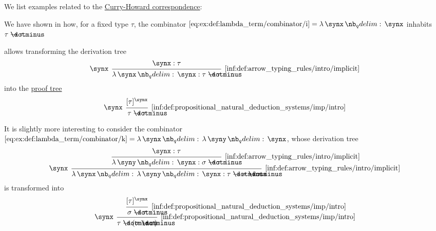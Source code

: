 \begin{example}\label{ex:con:curry_howard_correspondence}
  We list examples related to the \hyperref[con:curry_howard_correspondence]{Curry-Howard correspondence}:
  \begin{thmenum}
     We have shown in  how, for a fixed type \( \tau \), the combinator \( \ref{eq:ex:def:lambda_term/combinator/i} = \qabs \synx \synx \) inhabits \( \tau \synimplies \tau \).

     allows transforming the derivation tree
    \begin{equation*}
      \begin{prooftree}
        \hypo{ \synx: \tau }
        \infer[left label=\( \synx \)]1[\ref{inf:def:arrow_typing_rules/intro/implicit}]{ \qabs \synx \synx: \tau \synimplies \tau }
      \end{prooftree}
    \end{equation*}
    into the \hyperref[def:natural_deduction_proof_tree]{proof tree}
    \begin{equation*}
      \begin{prooftree}
        \hypo{ [\tau]^\synx }
        \infer[left label=\( \synx \)]1[\ref{inf:def:propositional_natural_deduction_systems/imp/intro}]{ \tau \synimplies \tau }
      \end{prooftree}
    \end{equation*}

    It is slightly more interesting to consider the combinator \( \ref{eq:ex:def:lambda_term/combinator/k} = \qabs \synx \qabs \syny \synx \), whose derivation tree
    \begin{equation*}
      \begin{prooftree}
        \hypo{ \synx: \tau }
        \infer1[\ref{inf:def:arrow_typing_rules/intro/implicit}]{ \qabs \syny \synx: \sigma \synimplies \tau }
        \infer[left label=\( \synx \)]1[\ref{inf:def:arrow_typing_rules/intro/implicit}]{ \qabs \synx \qabs \syny \synx: \tau \synimplies \sigma \synimplies \tau }
      \end{prooftree}
    \end{equation*}
    is transformed into
    \begin{equation*}
      \begin{prooftree}
        \hypo{ [\tau]^\synx }
        \infer1[\ref{inf:def:propositional_natural_deduction_systems/imp/intro}]{ \sigma \synimplies \tau }
        \infer[left label=\( \synx \)]1[\ref{inf:def:propositional_natural_deduction_systems/imp/intro}]{ \tau \synimplies (\sigma \synimplies \tau) }
      \end{prooftree}
    \end{equation*}


\end{thmenum}
\end{example}
